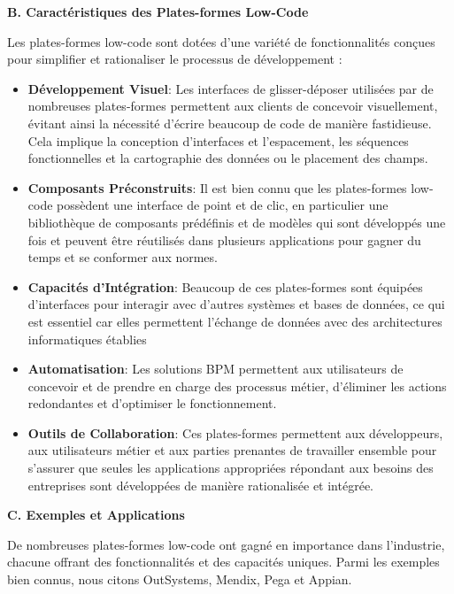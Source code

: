 \textbf{B. Caractéristiques des Plates-formes Low-Code}

Les plates-formes low-code sont dotées d'une variété de fonctionnalités conçues pour simplifier et rationaliser le processus de développement :

\begin{itemize}
\item \textbf{Développement Visuel}: Les interfaces de glisser-déposer utilisées par de nombreuses plates-formes permettent aux clients de concevoir visuellement, évitant ainsi la nécessité d'écrire beaucoup de code de manière fastidieuse. Cela implique la conception d'interfaces et l'espacement, les séquences fonctionnelles et la cartographie des données ou le placement des champs.

\item \textbf{Composants Préconstruits}: Il est bien connu que les plates-formes low-code possèdent une interface de point et de clic, en particulier une bibliothèque de composants prédéfinis et de modèles qui sont développés une fois et peuvent être réutilisés dans plusieurs applications pour gagner du temps et se conformer aux normes.

\item \textbf{Capacités d'Intégration}: Beaucoup de ces plates-formes sont équipées d'interfaces pour interagir avec d'autres systèmes et bases de données, ce qui est essentiel car elles permettent l'échange de données avec des architectures informatiques établies

\item \textbf{Automatisation}: Les solutions BPM permettent aux utilisateurs de concevoir et de prendre en charge des processus métier, d'éliminer les actions redondantes et d'optimiser le fonctionnement.

\item \textbf{Outils de Collaboration}: Ces plates-formes permettent aux développeurs, aux utilisateurs métier et aux parties prenantes de travailler ensemble pour s'assurer que seules les applications appropriées répondant aux besoins des entreprises sont développées de manière rationalisée et intégrée.

\end{itemize}

\textbf{C. Exemples et Applications }

De nombreuses plates-formes low-code ont gagné en importance dans l'industrie, chacune offrant des fonctionnalités et des capacités uniques. Parmi les exemples bien connus, nous citons OutSystems, Mendix, Pega et Appian.



